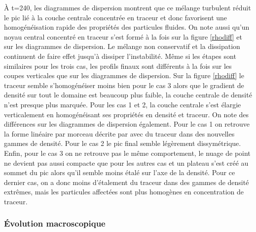 \documentclass[a4paper,12pt]{article}
\begin{document}
    À t=240, les diagrammes de dispersion montrent que ce mélange turbulent réduit le pic lié à la couche centrale concentrée en traceur et donc favorisent une homogénéisation rapide des propriétés des particules fluides. On note aussi qu'un noyau central concentré en traceur s'est formé à la fois sur la figure \ref{rhodiff} et sur les diagrammes de dispersion. Le mélange non conservatif et la dissipation continuent de faire effet jusqu'à dissiper l'instabilité. Même si les étapes sont similaires pour les trois cas, les profils finaux sont différents à la fois sur les coupes verticales que sur les diagrammes de dispersion. Sur la figure \ref{rhodiff} le traceur semble s'homogénéiser moins bien pour le cas 3 alors que le gradient de densité sur tout le domaine est beaucoup plus faible, la couche centrale de densité n'est presque plus marquée. Pour les cas 1 et 2, la couche centrale s'est élargie verticalement en homogénéisant ses propriétés en densité et traceur. On note des différences sur les diagrammes de dispersion également. Pour le cas 1 on retrouve la forme linéaire par morceau décrite par \cite{penney_diapycnal_2020} avec du traceur dans des nouvelles gammes de densité. Pour le cas 2 le pic final semble légèrement dissymétrique. Enfin, pour le cas 3 on ne retrouve pas le même comportement, le nuage de point ne devient pas aussi compacte que pour les autres cas et un plateau s'est créé au sommet du pic alors qu'il semble moins étalé sur l'axe de la densité. Pour ce dernier cas, on a donc moins d'étalement du traceur dans des gammes de densité extrêmes, mais les particules affectées sont plus homogènes en concentration de traceur.
    
    \subsubsection{Évolution macroscopique}
    
\end{document}
